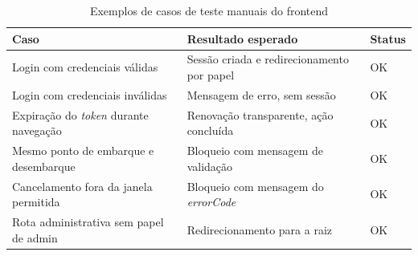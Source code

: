 \begin{table}[H]
\centering
\caption{Exemplos de casos de teste manuais do frontend}
\label{tab:testes_manuais}
\begin{tabularx}{\textwidth}{>{\raggedright\arraybackslash}X >{\raggedright\arraybackslash}X l}
\toprule
\textbf{Caso} & \textbf{Resultado esperado} & \textbf{Status} \\
\midrule
Login com credenciais válidas & Sessão criada e redirecionamento por papel & OK \\
Login com credenciais inválidas & Mensagem de erro, sem sessão & OK \\
Expiração do \textit{token} durante navegação & Renovação transparente, ação concluída & OK \\
Mesmo ponto de embarque e desembarque & Bloqueio com mensagem de validação & OK \\
Cancelamento fora da janela permitida & Bloqueio com mensagem do \textit{errorCode} & OK \\
Rota administrativa sem papel de admin & Redirecionamento para a raiz & OK \\
\bottomrule
\end{tabularx}
\end{table}

